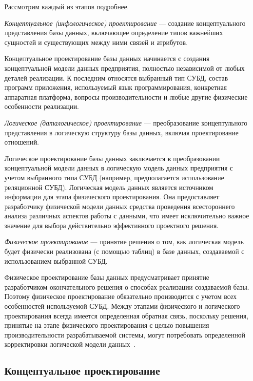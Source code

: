 \pagebreak

Рассмотрим каждый из этапов подробнее.

\textit{Концептуальное (инфологическое) проектирование} --- создание концептуального
представления базы данных, включающее определение типов важнейших сущностей и существующих
между ними связей и атрибутов.

Концептуальное проектирование базы данных начинается с создания концептуальной
модели данных предприятия, полностью независимой от любых деталей
реализации.
К последним относятся выбранный тип СУБД,
состав программ приложения, используемый язык программирования, конкретная аппаратная
платформа, вопросы производительности и любые другие физические особенности реализации.


\textit{Логическое (даталогическое) проектирование} --- преобразование
концептульного представления в логическую структуру базы данных,
включая проектирование отношений.

Логическое проектирование базы данных заключается в преобразовании
концептуальной модели данных в логическую модель данных предприятия с учетом
выбранного типа СУБД (например, предполагается использование
реляционной СУБД). Логическая модель данных является источником информации
для этапа физического проектирования. Она предоставляет разработчику
физической модели данных средства проведения всестороннего анализа различных
аспектов работы с данными, что имеет исключительно важное значение для
выбора действительно эффективного проектного решения.

\textit{Физическое проектирование} --- принятие решения о том, как логическая модель
будет физически реализована (с помощью таблиц) в базе данных, создаваемой
с использованием выбранной СУБД.

Физическое проектирование базы данных предусматривает принятие разработчиком
окончательного решения о способах реализации создаваемой базы. Поэтому
физическое проектирование обязательно производится с учетом всех особенностей
используемой СУБД. Между этапами физического и логического проектирования
всегда имеется определенная обратная связь, поскольку решения,
принятые на этапе физического проектирования с целью повышения производительности
разрабатываемой системы, могут потребовать определенной корректировки логической
модели данных~\cite{konnolli03}.

\subsection{Концептуальное проектирование}
\label{sub:db_structure_concept_design}

